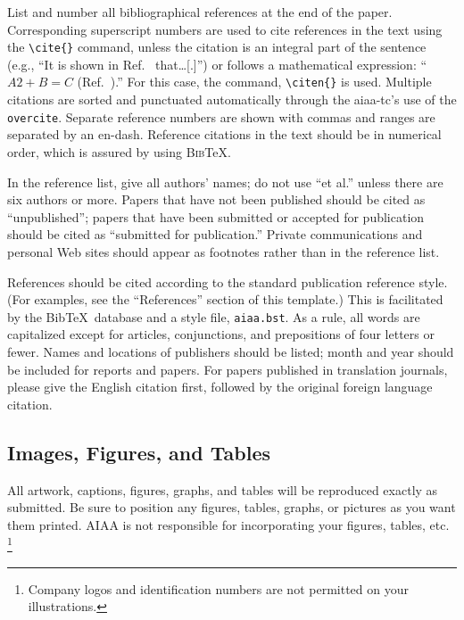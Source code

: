 \documentclass{aiaa-tc}%
\newcommand{\pkg}[1]{\texttt{#1}}
\newcommand{\cls}[1]{\textsf{#1}}
\newcommand{\file}[1]{\texttt{#1}}
\begin{document}
List and number all bibliographical references at the end of the paper.
Corresponding superscript numbers are used to cite references in the
text using the \verb|\cite{}| command,\cite{sutton:85ar} unless the
citation is an integral part of the sentence (e.g., ``It is shown in
Ref.~ that\ldots[.]'') 
or follows a mathematical expression: ``$A2 + B = C$
(Ref.~).''
For this case, the command, \verb|\citen{}| is used.
\cite{*}%
Multiple citations are sorted and punctuated automatically through the
\cls{aiaa-tc}'s use of the \pkg{overcite}. 
Separate reference numbers are shown with
commas\cite{sutton:85ar,miner:75ncr,turner:64a} and ranges are 
separated by an en-dash.\cite{sutton:85ar,miner:75ncr,wirin:90cp}
Reference citations in the text should be in numerical order, which is
assured by using \textsc{Bib}\TeX.

In the reference list, give all authors' names; do not use ``et al.''
unless there are six authors or more.
Papers that have not been published should be cited as ``unpublished'';
papers that have been submitted or accepted for publication should be
cited as ``submitted for publication.''
Private communications and personal Web sites should appear as footnotes
rather than in the reference list.

References should be cited according to the standard publication
reference style.
(For examples, see the ``References'' section of this template.)
This is facilitated by the Bib\TeX\ database and a style file, \file{aiaa.bst}.
As a rule, all words are capitalized except for articles, conjunctions,
and prepositions of four letters or fewer.
Names and locations of publishers should be listed; month and year
should be included for reports and papers.
For papers published in translation journals, please give the English
citation first, followed by the original foreign language citation.

\subsection{Images, Figures, and Tables}

All artwork, captions, figures, graphs, and tables will be reproduced
exactly as submitted.
Be sure to position any figures, tables, graphs, or pictures as you want
them printed.
AIAA is not responsible for incorporating your figures, tables,
etc.%
\footnote{Company logos and identification numbers are not permitted on
  your illustrations.}
\end{document}
